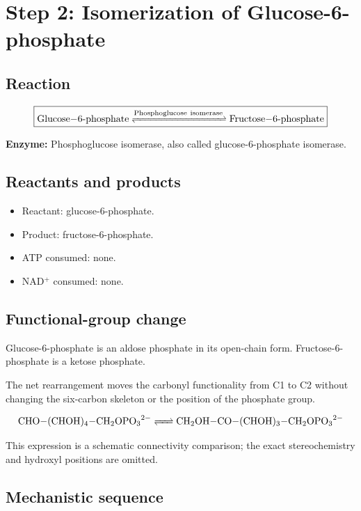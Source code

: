 \documentclass[11pt,a4paper]{article}
\newcommand{\Enz}[1]{\textbf{Enzyme:} #1}
\begin{document}
\section{Step 2: Isomerization of Glucose-6-phosphate}
\label{step:2}

\subsection{Reaction}

\[
\boxed{
\ce{Glucose-6-phosphate <=>[Phosphoglucose\ isomerase]
Fructose-6-phosphate}
}
\]

\Enz{Phosphoglucose isomerase, also called glucose-6-phosphate
isomerase.}

\subsection{Reactants and products}

\begin{itemize}
  \item Reactant: glucose-6-phosphate.
  \item Product: fructose-6-phosphate.
  \item ATP consumed: none.
  \item NAD$^+$ consumed: none.
\end{itemize}

\subsection{Functional-group change}

Glucose-6-phosphate is an aldose phosphate in its open-chain form.
Fructose-6-phosphate is a ketose phosphate.

The net rearrangement moves the carbonyl functionality from C1
to C2 without changing the six-carbon skeleton or the position
of the phosphate group.

\[
\ce{
CHO-(CHOH)4-CH2OPO3^{2-}
<=>
CH2OH-CO-(CHOH)3-CH2OPO3^{2-}
}
\]

This expression is a schematic connectivity comparison; the exact
stereochemistry and hydroxyl positions are omitted.

\subsection{Mechanistic sequence}
\end{document}
